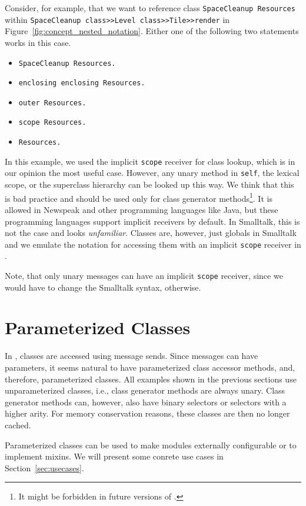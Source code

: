 Consider, for example, that we want to reference class \texttt{SpaceCleanup Resources} within \texttt{SpaceCleanup class>>Level class>>Tile>>render} in Figure~\ref{fig:concept_nested_notation}. Either one of the following two statements works in this case.

\begin{itemize}
	\item \texttt{SpaceCleanup Resources.}
	\item \texttt{enclosing enclosing Resources.}
	\item \texttt{outer Resources.}
	\item \texttt{scope Resources.}
	\item \texttt{Resources.}
\end{itemize}

In this example, we used the implicit \texttt{scope} receiver for class lookup, which is in our opinion the most useful case. However, any unary method in \texttt{self}, the lexical scope, or the superclass hierarchy can be looked up this way. We think that this is bad practice and should be used only for class generator methods\footnote{It might be forbidden in future versions of \msname.}. It is allowed in Newspeak and other programming languages like Java, but these programming languages support implicit receivers by default. In Smalltalk, this is not the case and looks \emph{unfamiliar}. Classes are, however, just globals in Smalltalk and we emulate the notation for accessing them with an implicit \texttt{scope} receiver in \msname. 

Note, that only unary messages can have an implicit \texttt{scope} receiver, since we would have to change the Smalltalk syntax, otherwise.

\section{Parameterized Classes}
\label{sec:conz_param_cls}
In \msname, classes are accessed using message sends. Since messages can have parameters, it seems natural to have parameterized class accessor methods, and, therefore, parameterized classes. All examples shown in the previous sections use unparameterized classes, i.e., class generator methods are always unary. Class generator methods can, however, also have binary selectors or selectors with a higher arity. For memory conservation reasons, these classes are then no longer cached.

Parameterized classes can be used to make modules externally configurable or to implement mixins. We will present some conrete use cases in Section~\ref{sec:usecases}.

